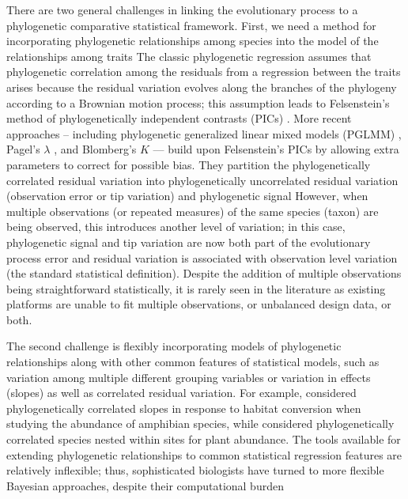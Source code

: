 There are two general challenges in linking the evolutionary process to a phylogenetic comparative statistical framework.
First, we need a method for incorporating phylogenetic relationships among species into the model of the relationships among traits
The classic phylogenetic regression assumes that phylogenetic correlation among the residuals from a regression between the traits arises because the residual variation evolves along the branches of the phylogeny according to a Brownian motion process; this assumption leads to Felsenstein's method of phylogenetically independent contrasts (PICs) \citep{felsenstein1985phylogenies}.
More recent approaches -- including phylogenetic generalized linear mixed models (PGLMM) \citep{ives2011generalized}, Pagel's $\lambda$ \citep{pagel1999inferring}, and Blomberg's $K$ \citep{blomberg2003testing} --- build upon Felsenstein's PICs by allowing extra parameters to correct for possible bias. They partition the phylogenetically correlated residual variation into phylogenetically uncorrelated residual variation (observation error or tip variation) and phylogenetic signal  \citep[biological/evolutionary process error:][]{hansen2012interpreting} 
However, when multiple observations (or repeated measures) of the same species (taxon) are being observed, this introduces another level of variation; in this case, phylogenetic signal and tip variation are now both part of the evolutionary process error and residual variation is associated with observation level variation (the standard statistical definition). 
Despite the addition of multiple observations being straightforward statistically, it is rarely seen in the literature as existing platforms are unable to fit multiple observations, or unbalanced design data, or both.

The second challenge is flexibly incorporating models of phylogenetic relationships along with other common features of statistical models, such as variation among multiple different grouping variables or variation in effects (slopes) as well as correlated residual variation.
For example, \cite{nowakowski2018phylogenetic} considered phylogenetically correlated slopes in response to habitat conversion when studying the abundance of amphibian species, while \cite{li2017canfun} considered phylogenetically correlated species nested within sites for plant abundance. 
The tools available for extending phylogenetic relationships to common statistical regression features are relatively inflexible; thus, sophisticated biologists have turned to more flexible Bayesian approaches, despite their computational burden 

